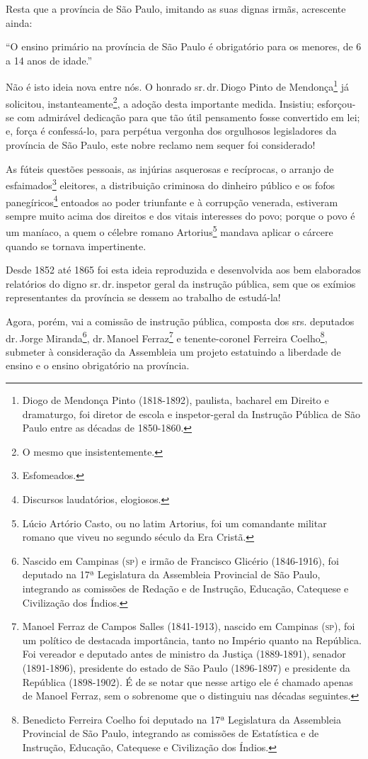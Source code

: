 Resta que a província de São Paulo, imitando as suas dignas irmãs,
acrescente ainda:

``O ensino primário na província de São Paulo é obrigatório para os
menores, de 6 a 14 anos de idade.''

Não é isto ideia nova entre nós. O honrado sr.\,dr.\,Diogo Pinto de
Mendonça\footnote{Diogo de Mendonça Pinto (1818-1892), paulista,
  bacharel em Direito e dramaturgo, foi diretor de escola e
  inspetor-geral da Instrução Pública de São Paulo entre as décadas de
  1850-1860.} já solicitou, instanteamente\footnote{O mesmo que
  insistentemente.}, a adoção desta importante medida. Insistiu;
esforçou-se com admirável dedicação para que tão útil pensamento fosse
convertido em lei; e, força é confessá-lo, para perpétua vergonha dos
orgulhosos legisladores da província de São Paulo, este nobre reclamo nem
sequer foi considerado!

As fúteis questões pessoais, as injúrias asquerosas e recíprocas, o
arranjo de esfaimados\footnote{Esfomeados.} eleitores, a distribuição
criminosa do dinheiro público e os fofos panegíricos\footnote{
  Discursos laudatórios, elogiosos.} entoados ao poder triunfante e à
corrupção venerada, estiveram sempre muito acima dos direitos e dos
vitais interesses do povo; porque o povo é um maníaco, a quem o célebre
romano Artorius\footnote{Lúcio Artório Casto, ou no latim Artorius,
  foi um comandante militar romano que viveu no segundo século da Era
  Cristã.} mandava aplicar o cárcere quando se tornava impertinente.

Desde 1852 até 1865 foi esta ideia reproduzida e desenvolvida aos bem
elaborados relatórios do digno sr.\,dr.\,inspetor geral da instrução
pública, sem que os exímios representantes da província se dessem ao
trabalho de estudá-la!

Agora, porém, vai a comissão de instrução pública, composta dos srs.
deputados dr.\,Jorge Miranda\footnote{Nascido em Campinas (\textsc{sp}) e irmão
  de Francisco Glicério (1846-1916), foi deputado na 17ª Legislatura da
  Assembleia Provincial de São Paulo, integrando as comissões de Redação
  e de Instrução, Educação, Catequese e Civilização dos Índios.}, dr.\,Manoel Ferraz\footnote{Manoel Ferraz de Campos Salles (1841-1913),
  nascido em Campinas (\textsc{sp}), foi um político de destacada importância,
  tanto no Império quanto na República. Foi vereador e deputado antes de
  ministro da Justiça (1889-1891), senador (1891-1896), presidente do
  estado de São Paulo (1896-1897) e presidente da República (1898-1902).
  É de se notar que nesse artigo ele é chamado apenas de Manoel Ferraz,
  sem o sobrenome que o distinguiu nas décadas seguintes.} e
tenente-coronel Ferreira Coelho\footnote{Benedicto Ferreira Coelho foi
  deputado na 17ª Legislatura da Assembleia Provincial de São Paulo,
  integrando as comissões de Estatística e de Instrução, Educação,
  Catequese e Civilização dos Índios.}, submeter à consideração da
Assembleia um projeto estatuindo a liberdade de ensino e o ensino
obrigatório na província.

